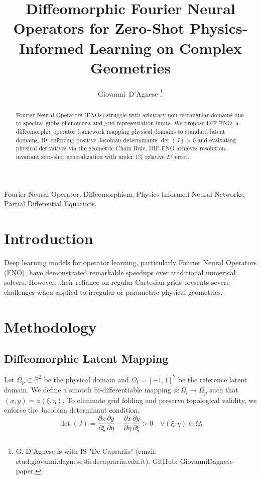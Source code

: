 \documentclass[journal]{IEEEtran}
\begin{document}
\title{Diffeomorphic Fourier Neural Operators for Zero-Shot Physics-Informed Learning on Complex Geometries}

\author{Giovanni~D'Agnese%
\thanks{G. D'Agnese is with IS "De Caprariis" (email: stud.giovanni.dagnese@isdecaprariis.edu.it). GitHub: GiovanniDagnese-paper.}}

\maketitle

\begin{abstract}
Fourier Neural Operators (FNOs) struggle with arbitrary non-rectangular domains due to spectral gibbs phenomena and grid representation limits. We propose DIF-FNO, a diffeomorphic operator framework mapping physical domains to standard latent domains. By enforcing positive Jacobian determinants $\det(J) > 0$ and evaluating physical derivatives via the geometric Chain Rule, DIF-FNO achieves resolution-invariant zero-shot generalization with under $1\%$ relative $L^2$ error.
\end{abstract}

\begin{IEEEkeywords}
Fourier Neural Operator, Diffeomorphism, Physics-Informed Neural Networks, Partial Differential Equations.
\end{IEEEkeywords}

\section{Introduction}
Deep learning models for operator learning, particularly Fourier Neural Operators (FNO), have demonstrated remarkable speedups over traditional numerical solvers. However, their reliance on regular Cartesian grids presents severe challenges when applied to irregular or parametric physical geometries.

\section{Methodology}
\subsection{Diffeomorphic Latent Mapping}
Let $\Omega_p \subset \mathbb{R}^2$ be the physical domain and $\Omega_l = [-1, 1]^2$ be the reference latent domain. We define a smooth bi-differentiable mapping $\phi: \Omega_l \to \Omega_p$ such that $(x, y) = \phi(\xi, \eta)$. To eliminate grid folding and preserve topological validity, we enforce the Jacobian determinant condition:
\begin{equation}
\det(J) = \frac{\partial x}{\partial \xi}\frac{\partial y}{\partial \eta} - \frac{\partial x}{\partial \eta}\frac{\partial y}{\partial \xi} > 0 \quad \forall (\xi, \eta) \in \Omega_l
\end{equation}
\end{document}

